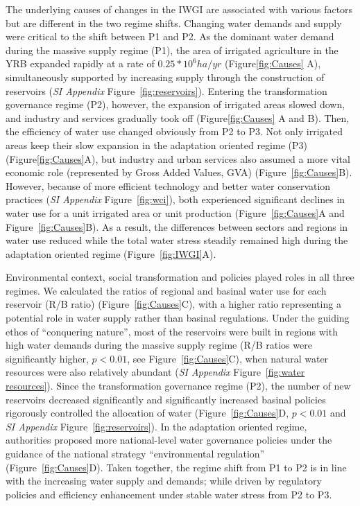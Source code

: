 The underlying causes of changes in the IWGI are associated with various factors but are different in the two regime shifts.
Changing water demands and supply were critical to the shift between P1 and P2.
As the dominant water demand during the massive supply regime (P1), the area of irrigated agriculture in the YRB expanded rapidly at a rate of $0.25*10^6 ha/yr$ (Figure\ref{fig:Causes} A), simultaneously supported by increasing supply through the construction of reservoirs (\textit{SI Appendix} Figure~\ref{fig:reservoirs}).
Entering the transformation governance regime (P2), however, the expansion of irrigated areas slowed down, and industry and services gradually took off (Figure\ref{fig:Causes} A and B).
Then, the efficiency of water use changed obviously from P2 to P3.
Not only irrigated areas keep their slow expansion in the adaptation oriented regime (P3) (Figure\ref{fig:Causes}A), but industry and urban services also assumed a more vital economic role (represented by Gross Added Values, GVA) (Figure~\ref{fig:Causes}B).
However, because of more efficient technology and better water conservation practices (\textit{SI Appendix} Figure~\ref{fig:wci}), both experienced significant declines in water use for a unit irrigated area or unit production (Figure~\ref{fig:Causes}A and Figure~\ref{fig:Causes}B).
As a result, the differences between sectors and regions in water use reduced while the total water stress steadily remained high during the adaptation oriented regime (Figure~\ref{fig:IWGI}A).

Environmental context, social transformation and policies played roles in all three regimes.
We calculated the ratios of regional and basinal water use for each reservoir (R/B ratio) (Figure~\ref{fig:Causes}C), with a higher ratio representing a potential role in water supply rather than basinal regulations.
Under the guiding ethos of ``conquering nature'', most of the reservoirs were built in regions with high water demands during the massive supply regime (R/B ratios were significantly higher, $p<0.01$, see Figure~\ref{fig:Causes}C), when natural water resources were also relatively abundant (\textit{SI Appendix} Figure~\ref{fig:water resources}).
Since the transformation governance regime (P2), the number of new reservoirs decreased significantly and significantly increased basinal policies rigorously controlled the allocation of water (Figure~\ref{fig:Causes}D, $p<0.01$ and \textit{SI Appendix} Figure~\ref{fig:reservoirs}).
In the adaptation oriented regime, authorities proposed more national-level water governance policies under the guidance of the national strategy ``environmental regulation'' (Figure~\ref{fig:Causes}D).
Taken together, the regime shift from P1 to P2 is in line with the increasing water supply and demands; while driven by regulatory policies and efficiency enhancement under stable water stress from P2 to P3.
